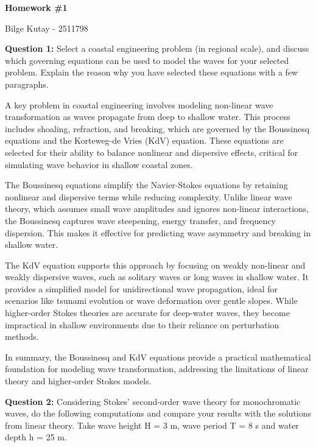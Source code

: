 \documentclass[a4paper]{article}
\begin{document}
\begin{center}
\textbf{\large{Homework \#1}}

Bilge Kutay - 2511798
\end{center}

\textbf{Question 1:} Select a coastal engineering problem (in regional scale), and discuss which
governing equations can be used to model the waves for your selected problem. Explain the reason
why you have selected these equations with a few paragraphs.
\vspace{0.3cm}

A key problem in coastal engineering involves modeling non-linear wave transformation as waves propagate from deep to shallow water. This process includes shoaling, refraction, and breaking, which are governed by the Boussinesq equations and the Korteweg-de Vries (KdV) equation. These equations are selected for their ability to balance nonlinear and dispersive effects, critical for simulating wave behavior in shallow coastal zones.

The Boussinesq equations simplify the Navier-Stokes equations by retaining nonlinear and dispersive terms while reducing complexity. Unlike linear wave theory, which assumes small wave amplitudes and ignores non-linear interactions, the Boussinesq captures wave steepening, energy transfer, and frequency dispersion. This makes it effective for predicting wave asymmetry and breaking in shallow water.

The KdV equation supports this approach by focusing on weakly non-linear and weakly dispersive waves, such as solitary waves or long waves in shallow water. It provides a simplified model for unidirectional wave propagation, ideal for scenarios like tsunami evolution or wave deformation over gentle slopes. While higher-order Stokes theories are accurate for deep-water waves, they become impractical in shallow environments due to their reliance on perturbation methods.

In summary, the Boussinesq and KdV equations provide a practical mathematical foundation for modeling wave transformation, addressing the limitations of linear theory and higher-order Stokes models. 

\vspace{0.5cm}
\textbf{Question 2:} Considering Stokes’ second-order wave theory for monochromatic waves,
do the following computations and compare your results with the solutions from linear theory. Take
wave height H = 3 m, wave period T = 8 s and water depth h = 25 m.
\vspace{0.3cm}
\end{document}
